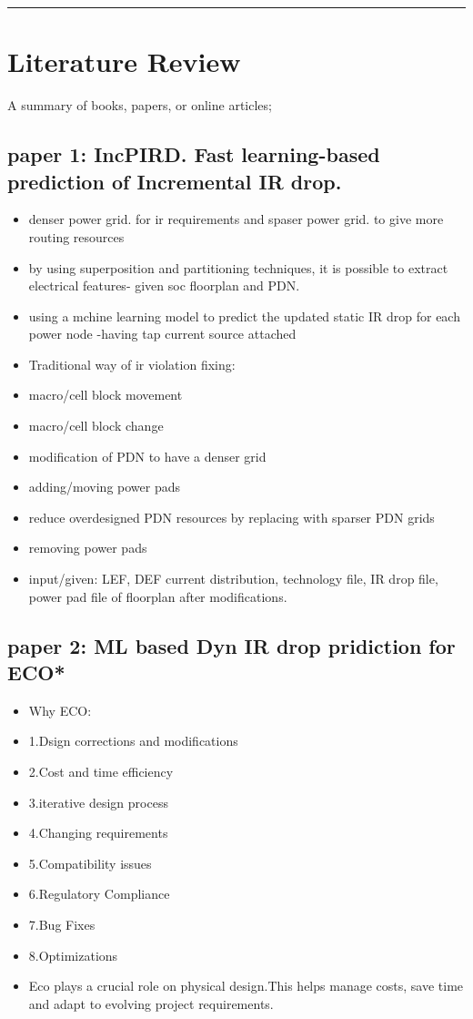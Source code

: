 \documentclass[a4paper]{article}
\begin{document}
\noindent\rule{\textwidth}{0.5pt}

\section{Literature Review}
\label{sec:orgcd3e47e}
A summary of books, papers, or online articles;

\subsection{paper 1: IncPIRD. Fast learning-based prediction of Incremental IR drop.}
\label{sec:orgf776efd}
\begin{itemize}
\item denser power grid. for ir requirements and spaser power grid. to give more routing resources
\item by using superposition and partitioning techniques, it is possible to extract electrical features- given soc floorplan and PDN.
\item using a mchine learning model to predict the updated static IR drop for each power node -having tap current source attached
\item Traditional way of ir violation fixing:
\item macro/cell block movement
\item macro/cell block change
\item modification of PDN to have a denser grid
\item adding/moving power pads
\item reduce overdesigned PDN resources by replacing with sparser PDN grids
\item removing power pads

\item input/given: LEF, DEF current distribution, technology file, IR drop file, power pad file of floorplan after modifications.
\end{itemize}


\subsection{paper 2: ML based Dyn IR drop pridiction for ECO*}
\label{sec:orgb93b7e8}

\begin{itemize}
\item Why ECO:
\item 1.Dsign corrections and modifications
\item 2.Cost and time efficiency
\item 3.iterative design process
\item 4.Changing requirements
\item 5.Compatibility issues
\item 6.Regulatory Compliance
\item 7.Bug Fixes
\item 8.Optimizations
\item Eco plays a crucial role on physical design.This helps manage costs, save time and adapt to evolving project requirements.
\end{itemize}
\end{document}
